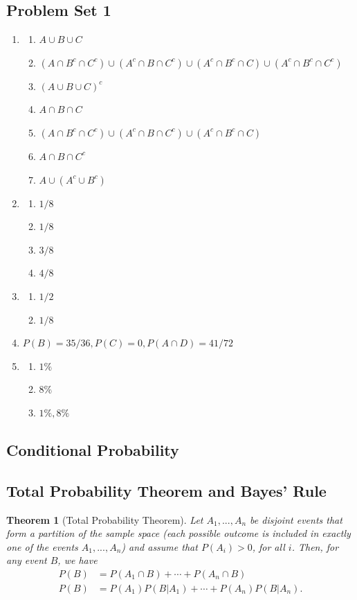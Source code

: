\documentclass{article} \usepackage[margin=1in]{geometry}
\newtheorem*{theorem*}{Theorem}
\begin{document}
\subsection*{Problem Set 1}
\begin{enumerate}
	\item \begin{enumerate}
		      \item $A\cup B\cup C$
		      \item $(A\cap B^c\cap C^c)\cup(A^c\cap B\cap C^c)\cup(A^c\cap B^c\cap C)
			            \cup(A^c\cap B^c\cap C^c)$
		      \item $(A\cup B\cup C)^c$
		      \item $A\cap B\cap C$
		      \item $(A\cap B^c\cap C^c)\cup(A^c\cap B\cap C^c)\cup(A^c\cap B^c\cap C)$
		      \item $A\cap B\cap C^c$
		      \item $A\cup(A^c\cup B^c)$
	      \end{enumerate}
	\item \begin{enumerate}
		      \item $1/8$
		      \item $1/8$
		      \item $3/8$
		      \item $4/8$
	      \end{enumerate}
	\item \begin{enumerate}
		      \item $1/2$
		      \item $1/8$
	      \end{enumerate}
	\item $P(B)=35/36, P(C)=0, P(A\cap D)=41/72$
	\item \begin{enumerate}
		      \item $1\%$
		      \item $8\%$
		      \item $1\%, 8\%$
	      \end{enumerate}
\end{enumerate}
\subsection{Conditional Probability}
\subsection{Total Probability Theorem and Bayes' Rule}
\begin{theorem*}[Total Probability Theorem]
	Let $A_1,...,A_n$ be disjoint events that form a partition of the sample space (each possible outcome
	is included in exactly one of the events $A_1,...,A_n$) and assume that $P(A_i)>0$, for all $i$. Then,
	for any event $B$, we have
	\begin{align*}
		P(B) & = P(A_1\cap B)+\cdots+P(A_n\cap B)      \\
		P(B) & = P(A_1)P(B|A_1)+\cdots+P(A_n)P(B|A_n).
	\end{align*}
\end{theorem*}
\end{document}
